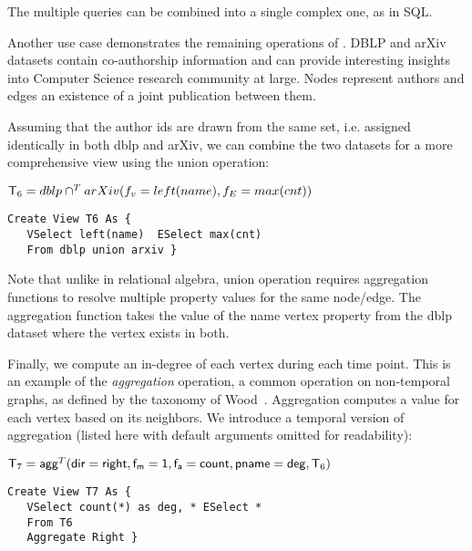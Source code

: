 The multiple queries can be combined into a single complex one, as in SQL.

Another use case demonstrates the remaining operations of \tga.  DBLP
and arXiv datasets contain co-authorship information and can provide
interesting insights into Computer Science research community at
large.  Nodes represent authors and edges an existence of a joint
publication between them.

\begin{example}
\label{ex:union}

Assuming that the author ids are drawn from the same set,
i.e. assigned identically in both dblp and arXiv, we can combine the
two datasets for a more comprehensive view using the union operation:

$\mathsf{T}_6 = dblp \cap^T arXiv (f_v=left(name),f_E=max(cnt))$

\begin{small}
\begin{verbatim}
Create View T6 As {
   VSelect left(name)  ESelect max(cnt)
   From dblp union arxiv }
\end{verbatim}
\end{small}

\end{example}

Note that unlike in relational algebra, \tga union operation requires
aggregation functions to resolve multiple property values for the same
node/edge.  The  aggregation function takes the value of
the name vertex property from the dblp dataset where the vertex exists
in both.

\begin{example}
\label{ex:agg}

Finally, we compute an in-degree of each vertex during each time
point.  This is an example of the {\em aggregation} operation, a
common operation on non-temporal graphs, as defined by the taxonomy of
Wood~\cite{Wood2012}.  Aggregation computes a value for each vertex
based on its neighbors.  We introduce a temporal version of
aggregation (listed here with default arguments omitted for
readability):

$\mathsf{T}_7 = \textsf{agg}^T(\mathsf{dir=right},\mathsf{f_m=1},\mathsf{f_a=count},\mathsf{pname=deg},\mathsf{T}_6)$

\begin{small} 
\begin{verbatim}
Create View T7 As { 
   VSelect count(*) as deg, * ESelect *
   From T6
   Aggregate Right }
\end{verbatim}
\end{small}

\end{example}

